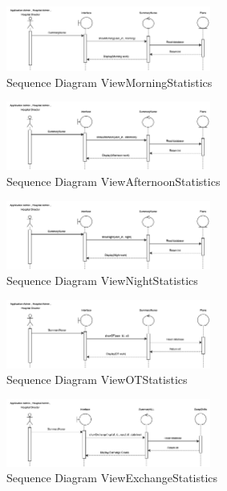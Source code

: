 \begin{figure}[h]
    \centering
    \includegraphics[width=0.6\textwidth]{Sequence 11.1.png}
    \caption{Sequence Diagram ViewMorningStatistics}
    \end{figure}

    \begin{figure}[h]
    \centering
    \includegraphics[width=0.6\textwidth]{Sequence 11.2.png}
    \caption{Sequence Diagram ViewAfternoonStatistics}
    \end{figure}

    \begin{figure}[h]
    \centering
    \includegraphics[width=0.6\textwidth]{Sequence 11.3.png}
    \caption{Sequence Diagram ViewNightStatistics}
    \end{figure}

    \begin{figure}[h]
    \centering
    \includegraphics[width=0.6\textwidth]{Sequence 11.4.png}
    \caption{Sequence Diagram ViewOTStatistics}
    \end{figure}

    \begin{figure}[h]
    \centering
    \includegraphics[width=0.6\textwidth]{Sequence 11.5.png}
    \caption{Sequence Diagram ViewExchangeStatistics}
    \end{figure}

